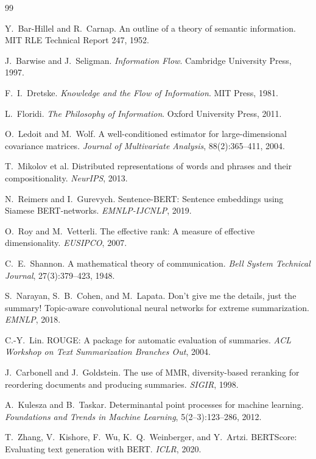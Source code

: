 \documentclass[11pt]{article}
\begin{document}
\begin{thebibliography}{99}

Y.\ Bar-Hillel and R.\ Carnap. An outline of a theory of semantic information. MIT RLE Technical Report 247, 1952.

J.\ Barwise and J.\ Seligman. \emph{Information Flow}. Cambridge University Press, 1997.

F.\ I.\ Dretske. \emph{Knowledge and the Flow of Information}. MIT Press, 1981.

L.\ Floridi. \emph{The Philosophy of Information}. Oxford University Press, 2011.

O.\ Ledoit and M.\ Wolf. A well-conditioned estimator for large-dimensional covariance matrices. \emph{Journal of Multivariate Analysis}, 88(2):365--411, 2004.

T.\ Mikolov et al. Distributed representations of words and phrases and their compositionality. \emph{NeurIPS}, 2013.

N.\ Reimers and I.\ Gurevych. Sentence-BERT: Sentence embeddings using Siamese BERT-networks. \emph{EMNLP-IJCNLP}, 2019.

O.\ Roy and M.\ Vetterli. The effective rank: A measure of effective dimensionality. \emph{EUSIPCO}, 2007.

C.\ E.\ Shannon. A mathematical theory of communication. \emph{Bell System Technical Journal}, 27(3):379--423, 1948.

S.\ Narayan, S.\ B.\ Cohen, and M.\ Lapata. Don't give me the details, just the summary! Topic-aware convolutional neural networks for extreme summarization. \emph{EMNLP}, 2018.

C.-Y.\ Lin. ROUGE: A package for automatic evaluation of summaries. \emph{ACL Workshop on Text Summarization Branches Out}, 2004.

J.\ Carbonell and J.\ Goldstein. The use of MMR, diversity-based reranking for reordering documents and producing summaries. \emph{SIGIR}, 1998.

A.\ Kulesza and B.\ Taskar. Determinantal point processes for machine learning. \emph{Foundations and Trends in Machine Learning}, 5(2--3):123--286, 2012.

T.\ Zhang, V.\ Kishore, F.\ Wu, K.\ Q.\ Weinberger, and Y.\ Artzi. BERTScore: Evaluating text generation with BERT. \emph{ICLR}, 2020.

\end{thebibliography}
\end{document}
